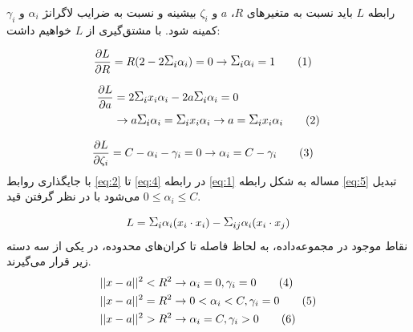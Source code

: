 \documentclass[twocolumn]{article}
\newcommand\numberthis[1][]{%
    \refstepcounter{equation}%
    \ifx#1\empty\else\label{eq:#1}\fi%
    \tag{\theequation}%
}
\begin{document}
رابطه $L$ باید نسبت به متغیرهای $R$، $a$ و $\zeta_i$ بیشینه و نسبت به ضرایب لاگرانژ $\alpha_i$ و $\gamma_i$ کمینه شود. با مشتق‌گیری از $L$ خواهیم داشت:

\begin{align*}
\frac{\partial L}{\partial R} &= R(2 - 2\mathlarger{\Sigma_i}\alpha_i) = 0 \rightarrow \mathlarger{\Sigma_i} \alpha_i = 1 
\numberthis
\label{eq:2}
\end{align*}

\begin{align*}
\frac{\partial L}{\partial a} &= 2 \mathlarger{\Sigma_i}x_i\alpha_i - 2 a \mathlarger{\Sigma_i}\alpha_i  = 0 \\ 
&\rightarrow a \mathlarger{\Sigma_i}\alpha_i = \mathlarger{\Sigma_i} x_i\alpha_i \rightarrow a =  \mathlarger{\Sigma_i} x_i\alpha_i 
\numberthis
\label{eq:3}
\end{align*}

\begin{align*}
\frac{\partial L}{\partial \zeta_i} &= C - \alpha_i - \gamma_i = 0 \rightarrow \alpha_i = C - \gamma_i
\numberthis
\label{eq:4}
\end{align*}
با جایگذاری روابط \eqref{eq:2} تا \eqref{eq:4} در رابطه \eqref{eq:1} مساله به شکل رابطه \eqref{eq:5} تبدیل می‌شود با در نظر گرفتن قید $0 \leq \alpha_i \leq C$.

\begin{equation}
L = \mathlarger{\Sigma_i} \alpha_i (x_i \cdot x_i) - \mathlarger{\Sigma_{ij}} \alpha_i (x_i \cdot x_j)
\label{eq:5}
\end{equation}
نقاط موجود در مجموعه‌داده، به لحاظ فاصله تا کران‌های محدوده، در یکی از سه دسته زیر قرار می‌گیرند.
\begin{align*}
&||x-a||^2 < R^2 \rightarrow \alpha_i = 0, \gamma_i = 0
\numberthis
\label{eq:6}
\\
&||x-a||^2 = R^2 \rightarrow 0 < \alpha_i < C, \gamma_i = 0
\numberthis
\label{eq:7}
\\
&||x-a||^2 > R^2 \rightarrow \alpha_i = C, \gamma_i > 0
\numberthis
\label{eq:8}
\end{align*}
\end{document}
